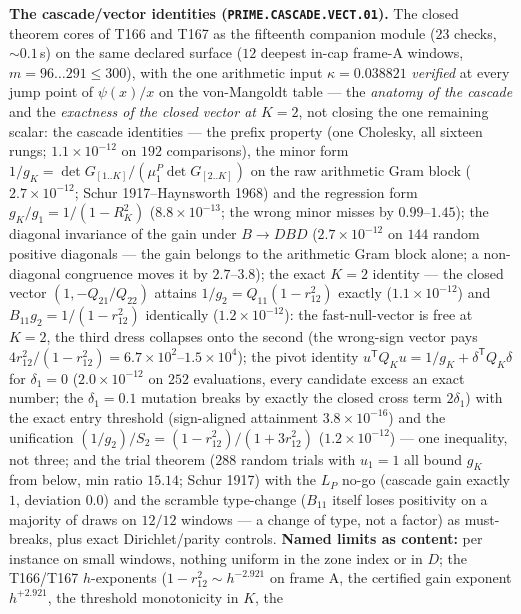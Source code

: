 \documentclass[11pt,a4paper]{article}
\theoremstyle{definition}
\begin{document}
\par\smallskip\noindent\textbf{The cascade/vector identities
(\texttt{PRIME.CASCADE.VECT.01}).}
The closed theorem cores of T166 and T167 as the fifteenth companion
module ($23$ checks, ${\sim}0.1$\,s) on the same declared surface ($12$
deepest in-cap frame-A windows, $m=96\ldots291\le300$), with the one
arithmetic input $\kappa=0.038821$ \emph{verified} at every jump point
of $\psi(x)/x$ on the von-Mangoldt table --- the \emph{anatomy of the
cascade} and the \emph{exactness of the closed vector at $K=2$}, not
closing the one remaining scalar: the cascade identities --- the prefix
property (one Cholesky, all sixteen rungs; $1.1\times10^{-12}$ on $192$
comparisons), the minor form
$1/g_K=\det G_{[1..K]}/(\mu^P_1\det G_{[2..K]})$ on the raw arithmetic
Gram block ($2.7\times10^{-12}$; Schur 1917--Haynsworth 1968) and the
regression form $g_K/g_1=1/(1-R_K^2)$ ($8.8\times10^{-13}$; the wrong
minor misses by $0.99$--$1.45$); the diagonal invariance of the gain
under $B\to DBD$ ($2.7\times10^{-12}$ on $144$ random positive
diagonals --- the gain belongs to the arithmetic Gram block alone; a
non-diagonal congruence moves it by $2.7$--$3.8$); the exact $K=2$
identity --- the closed vector $(1,-Q_{21}/Q_{22})$ attains
$1/g_2=Q_{11}(1-r_{12}^2)$ exactly ($1.1\times10^{-12}$) and
$B_{11}g_2=1/(1-r_{12}^2)$ identically ($1.2\times10^{-12}$): the
fast-null-vector is free at $K=2$, the third dress collapses onto the
second (the wrong-sign vector pays
$4r_{12}^2/(1-r_{12}^2)=6.7\times10^{2}$--$1.5\times10^{4}$); the pivot
identity $u^{\mathsf T}Q_Ku=1/g_K+\delta^{\mathsf T}Q_K\delta$ for
$\delta_1=0$ ($2.0\times10^{-12}$ on $252$ evaluations, every candidate
excess an exact number; the $\delta_1=0.1$ mutation breaks by exactly
the closed cross term $2\delta_1$) with the exact entry threshold
(sign-aligned attainment $3.8\times10^{-16}$) and the unification
$(1/g_2)/S_2=(1-r_{12}^2)/(1+3r_{12}^2)$ ($1.2\times10^{-12}$) --- one
inequality, not three; and the trial theorem ($288$ random trials with
$u_1=1$ all bound $g_K$ from below, min ratio $15.14$; Schur 1917) with
the $L_P$ no-go (cascade gain exactly $1$, deviation $0.0$) and the
scramble type-change ($B_{11}$ itself loses positivity on a majority of
draws on $12/12$ windows --- a change of type, not a factor) as
must-breaks, plus exact Dirichlet/parity controls.
\textbf{Named limits as content:} per instance on small windows,
nothing uniform in the zone index or in $D$; the T166/T167
$h$-exponents ($1-r_{12}^2\sim h^{-2.921}$ on frame A, the certified
gain exponent $h^{+2.921}$, the threshold monotonicity in $K$, the
\end{document}
